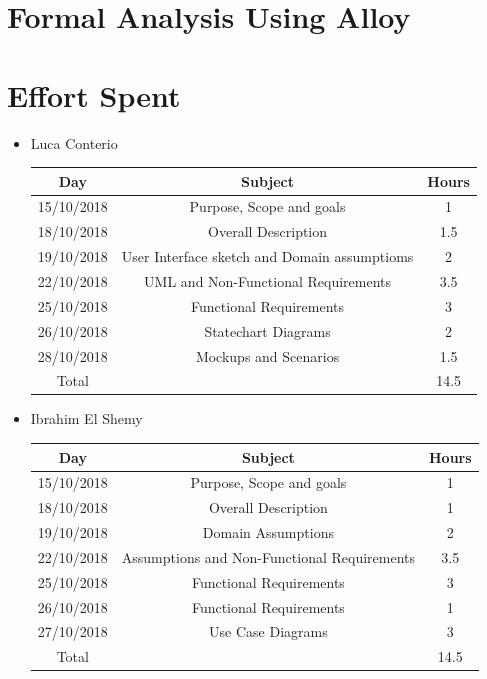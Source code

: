 \documentclass[12pt,a4paper]{article}
\begin{document}
	
	\newpage
	\section{Formal Analysis Using Alloy}
	
	\newpage
	
	\section{Effort Spent}
	\begin{itemize}
		\item Luca Conterio
		\begin{center}
			\begin{tabular}{| c | c | c |}
				\hline
				Day & Subject & Hours \\ \hline
				15/10/2018 & Purpose, Scope and goals & 1 \\
				18/10/2018 & Overall Description & 1.5 \\
				19/10/2018  & User Interface sketch and Domain assumptioms & 2 \\
				22/10/2018  & UML and Non-Functional Requirements & 3.5 \\
				25/10/2018 & Functional Requirements & 3 \\
				26/10/2018 & Statechart Diagrams & 2 \\
				28/10/2018 & Mockups and Scenarios & 1.5 \\
				\hline
				Total & & 14.5 \\
				\hline
			\end{tabular}
		\end{center}
		
		\item Ibrahim El Shemy
		\begin{center}
			\begin{tabular}{| c | c | c |}
				\hline
				Day & Subject & Hours \\ \hline
				15/10/2018 & Purpose, Scope and goals & 1 \\
				18/10/2018 & Overall Description & 1 \\
				19/10/2018  & Domain Assumptions & 2 \\
				22/10/2018  & Assumptions and Non-Functional Requirements & 3.5 \\
				25/10/2018 & Functional Requirements & 3 \\
				26/10/2018 & Functional Requirements & 1 \\
				27/10/2018 & Use Case Diagrams & 3 \\
				\hline
				Total & & 14.5 \\
				\hline
			\end{tabular}
		\end{center}
	\end{itemize}
\end{document}
